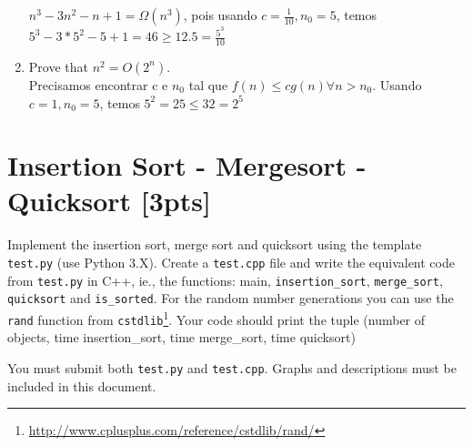 \documentclass{article}
\begin{document}
\begin{enumerate}[label=\Alph*]
		$n^3 -3n^2 -n+1 = \Omega(n^3)$, pois usando $c = \frac{1}{10}, n_0 = 5$, temos $ 5^3 -3*5^2 -5+1 = 46 \geq 12.5 = \frac{5^3}{10} $
		
		\item Prove that $n^2 = O(2^n)$. \\
		Precisamos encontrar c e $n_0$ tal que $f(n) \leq cg(n) \forall n > n_0$. Usando $c = 1, n_0 = 5$, temos $ 5^2 = 25 \leq 32 = 2^5$
		
	\end{enumerate}
	
	
	\section{Insertion Sort - Mergesort - Quicksort [3pts]}
	Implement the insertion sort, merge sort and quicksort using the template \texttt{test.py} (use Python 3.X). Create a \texttt{test.cpp} file and write the equivalent code from \texttt{test.py} in C++, ie., the functions: main, \texttt{insertion\_sort}, \texttt{merge\_sort}, \texttt{quicksort} and \texttt{is\_sorted}. For the random number generations you can use the \texttt{rand} function from \texttt{cstdlib}\footnote{\url{http://www.cplusplus.com/reference/cstdlib/rand/}}. Your code should print the tuple (number of objects, time insertion\_sort, time merge\_sort, time quicksort)
	
	You must submit both \texttt{test.py} and \texttt{test.cpp}. Graphs and descriptions must be included in this document. 
	
\end{document}
